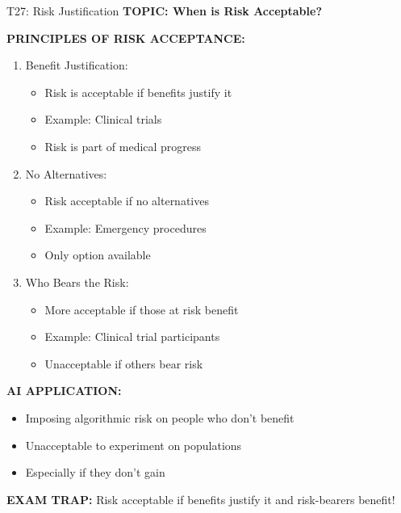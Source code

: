 \documentclass[8pt]{beamer}
\begin{document}
	\begin{frame}{T27: Risk Justification}
		\fontsize{6.5}{7.5}\selectfont
		\textbf{TOPIC: When is Risk Acceptable?}
		
		\vspace{0.1cm}
		\textbf{PRINCIPLES OF RISK ACCEPTANCE:}
		\begin{enumerate}
			\item \textcolor{myblue}{Benefit Justification:}
			\begin{itemize}
				\item Risk is acceptable if benefits justify it
				\item Example: Clinical trials
				\item Risk is part of medical progress
			\end{itemize}
			\item \textcolor{myblue}{No Alternatives:}
			\begin{itemize}
				\item Risk acceptable if no alternatives
				\item Example: Emergency procedures
				\item Only option available
			\end{itemize}
			\item \textcolor{myblue}{Who Bears the Risk:}
			\begin{itemize}
				\item More acceptable if those at risk benefit
				\item Example: Clinical trial participants
				\item Unacceptable if others bear risk
			\end{itemize}
		\end{enumerate}
		
		\vspace{0.1cm}
		\textbf{AI APPLICATION:}
		\begin{itemize}
			\item Imposing algorithmic risk on people who don't benefit
			\item Unacceptable to experiment on populations
			\item Especially if they don't gain
		\end{itemize}
		
		\textcolor{myred}{\textbf{EXAM TRAP:}} Risk acceptable if \textcolor{myblue}{benefits justify it and risk-bearers benefit}!
	\end{frame}
	
\end{document}
